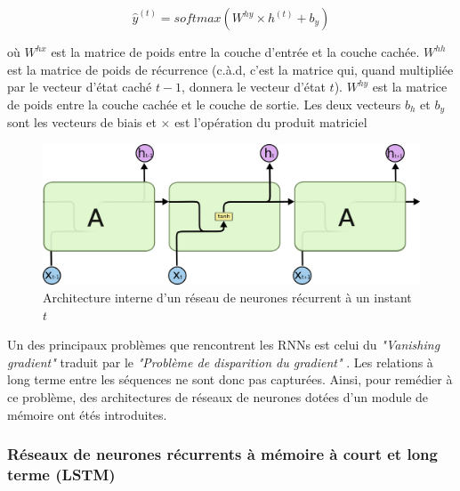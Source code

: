 \begin{equation}
\hat{y}^{(t)} = softmax(W^{hy} \times h^{(t)} + b_y)
\end{equation}

où $W^{hx}$ est la matrice de poids entre la couche d'entrée et la couche cachée. $W^{hh}$ est la matrice de poids de récurrence (c.à.d, c'est la matrice qui, quand multipliée par le vecteur d'état caché $t-1$, donnera le vecteur d'état $t$). $W^{hy}$ est la matrice de poids entre la couche cachée et le couche de sortie. Les deux vecteurs $b_h$ et $b_y$ sont les vecteurs de biais et $\times$ est l'opération du produit matriciel \citep{rnn_lstms}

\begin{figure}[H]
	\centering
	
	\includegraphics[width=0.5\linewidth]{images/notions/rnns_unrolled_online.png}
	\caption{Architecture interne d'un réseau de neurones récurrent à un instant $t$ \citep{rnns_online}}
\end{figure}
\par 
Un des principaux problèmes que rencontrent les RNNs est celui du \textit{"Vanishing gradient"} traduit par le \textit{"Problème de disparition du gradient"} \citep{vanishing_gradient}. Les relations à long terme entre les séquences ne sont donc pas capturées. Ainsi, pour remédier à ce problème, des architectures de réseaux de neurones dotées d'un module de mémoire ont étés introduites.

\subsubsection*{Réseaux de neurones récurrents à mémoire à court et long terme (LSTM)}
